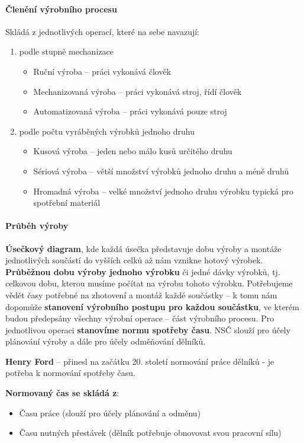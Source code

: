 \paragraph*{Členění výrobního procesu}
Skládá z jednotlivých operací, které na sebe navazují:
\begin{enumerate}
    \item podle stupně mechanizace
        \begin{itemize}
            \item  Ruční výroba -- práci vykonává člověk
            \item  Mechanizovaná výroba -- práci vykonává stroj, řídí člověk
            \item  Automatizovaná výroba -- práci vykonává pouze stroj
        \end{itemize}
    \item podle počtu vyráběných výrobků jednoho druhu
        \begin{itemize}
            \item Kusová výroba -- jeden nebo málo kusů určitého druhu
            \item Sériová výroba -- větší množství výrobků jednoho druhu a méně druhů
            \item Hromadná výroba -- velké množství jednoho druhu výrobku typická pro spotřební materiál
        \end{itemize}
\end{enumerate}

\paragraph*{Průběh výroby}
\textbf{Úsečkový diagram}, kde každá úsečka představuje dobu výroby a montáže jednotlivých součástí do vyšších celků až nám vznikne hotový výrobek.
\textbf{Průběžnou dobu výroby jednoho výrobku} či jedné dávky výrobků, tj. celkovou dobu, kterou musíme počítat na výrobu tohoto výrobku. Potřebujeme vědět časy potřebné na zhotovení a montáž každé součástky -- k tomu nám dopomůže \textbf{stanovení výrobního postupu pro každou součástku}, ve kterém budou předepsány všechny výrobní operace -- část výrobního procesu. Pro jednotlivou operaci \textbf{stanovíme normu spotřeby času}. NSČ slouží pro účely plánování výroby a dále pro účely odměňování dělníků.

\textbf{Henry Ford} -- přinesl na začátku 20. století normování práce dělníků - je potřeba k normování spotřeby času.

\textbf{Normovaný čas se skládá z}:
\begin{itemize}
    \item Času práce (slouží pro účely plánování a odměnu)
    \item Času nutných přestávek (dělník potřebuje obnovovat svou pracovní sílu)
\end{itemize}

